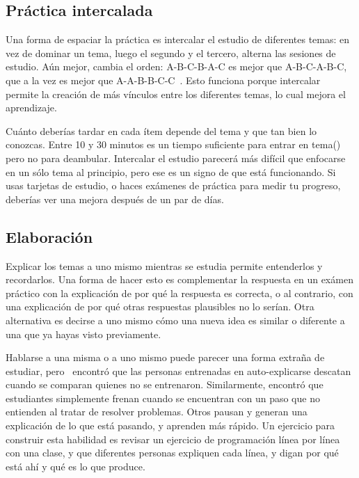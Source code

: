 \subsection*{Práctica intercalada}

Una forma de espaciar la práctica es intercalar el estudio de diferentes temas:
en vez de dominar un tema,
luego el segundo y el tercero,
alterna las sesiones de estudio.
Aún mejor,
cambia el orden:
A-B-C-B-A-C es mejor que A-B-C-A-B-C,
que a la vez es mejor que A-A-B-B-C-C~\cite{Rohr2015}.
Esto funciona porque intercalar permite la creación de más vínculos entre los diferentes temas,
lo cual mejora el aprendizaje.

Cuánto deberías tardar en cada ítem
depende del tema y que tan bien lo conozcas.
Entre 10 y 30 minutos es un tiempo suficiente para
entrar en tema()
pero no para deambular.
Intercalar el estudio parecerá más difícil que enfocarse en un sólo tema al principio,
pero ese es un signo de que está funcionando.
Si usas tarjetas de estudio, o haces exámenes de práctica para medir tu progreso,
deberías ver una mejora después de un par de días.

\subsection*{Elaboración}

Explicar los temas a uno mismo mientras se estudia
permite entenderlos y recordarlos.
Una forma de hacer esto es complementar la respuesta en un exámen práctico
con la explicación de por qué la respuesta es correcta,
o al contrario, con una explicación de por qué otras respuestas plausibles no lo serían.
Otra alternativa es decirse a uno mismo
cómo una nueva idea es similar o diferente a una que ya hayas visto previamente.

Hablarse a una misma o a uno mismo puede parecer una forma extraña de estudiar,
pero~\cite{Biel1995} encontró que
las personas entrenadas en auto-explicarse descatan cuando se comparan quienes no se entrenaron.
Similarmente,
\cite{Chi1989} encontró que estudiantes simplemente frenan cuando se encuentran con un paso que no entienden
al tratar de resolver problemas.
Otros pausan y generan una explicación de lo que está pasando,
y aprenden más rápido.
Un ejercicio para construir esta habilidad es revisar un ejercicio de programación línea por línea con una clase,
y que diferentes personas expliquen cada línea,
y digan por qué está ahí y qué es lo que produce.

